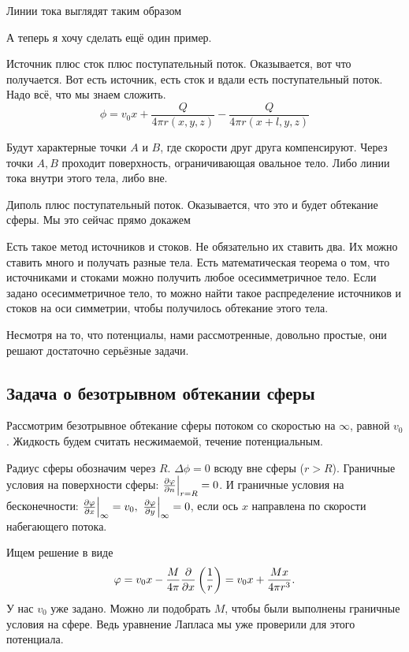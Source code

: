 Линии тока выглядят таким образом

А теперь я хочу сделать ещё один пример.
\begin{Exa}
  Источник плюс сток плюс поступательный поток. Оказывается, вот что получается.
 Вот есть источник, есть сток и вдали есть поступательный поток. Надо всё, что мы знаем сложить.
\[
  \phi = v_0 x + \frac Q{4\pi r(x,y,z)} - \frac Q{4\pi r(x+l,y,z)}
\]
\end{Exa}

Будут характерные точки $A$ и $B$, где скорости друг друга компенсируют. Через точки $A,B$ проходит поверхность, ограничивающая овальное тело. Либо линии тока внутри этого тела, либо вне.

\begin{Exa}
  Диполь плюс поступательный поток. Оказывается, что это и будет обтекание сферы. Мы это сейчас прямо докажем
\end{Exa}

Есть такое метод источников и стоков. Не обязательно их ставить два. Их можно ставить много и получать разные тела.
Есть математическая теорема о том, что источниками и стоками можно получить любое осесимметричное тело. Если задано осесимметричное тело, то можно найти такое распределение источников и стоков на оси симметрии, чтобы получилось обтекание этого тела.

Несмотря на то, что потенциалы, нами рассмотренные, довольно простые, они решают достаточно серьёзные задачи.

\subsection{Задача о безотрывном обтекании сферы}
Рассмотрим безотрывное обтекание сферы потоком со скоростью на $\infty$, равной $v_0$. Жидкость будем считать несжимаемой, течение потенциальным.

Радиус сферы обозначим через $R$. $\Delta \phi = 0$ всюду вне сферы ($r>R$). Граничные условия на поверхности сферы: $\frac{\partial \varphi}{\partial n}\Big|_{r=R}=0$.
И граничные условия на бесконечности: $\frac{\partial \varphi}{\partial x}\Big|_\infty = v_0,\ \frac{\partial \varphi}{\partial y}\Big|_\infty = 0$, если ось $x$ направлена по скорости набегающего потока.

Ищем решение в виде 
\[
  \varphi = v_0 x - \frac{M}{4\pi}\frac{\partial }{\partial x}\left(\frac 1r\right) = v_0 x +\frac{Mx}{4\pi r^3}.
\]
У нас $v_0$ уже задано. Можно ли подобрать $M$, чтобы были выполнены граничные условия на сфере. Ведь уравнение Лапласа мы уже проверили для этого потенциала.

